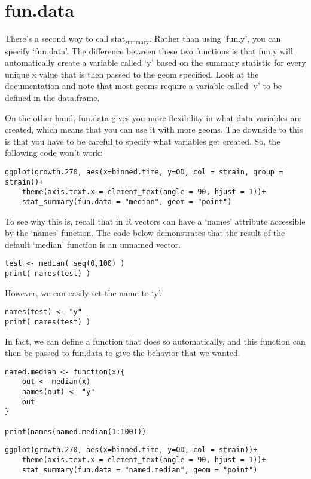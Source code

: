 \documentclass[11pt]{article}
\begin{document}
\section{fun.data}
\label{sec-2}


There's a second way to call stat$_{\mathrm{summary}}$. Rather than using `fun.y',
you can specify `fun.data'. The difference between these two functions
is that fun.y will automatically create a variable called `y' based on
the summary statistic for every unique x value that is then passed to the geom specified. 
Look at the documentation and note that most geoms require a variable
called `y' to be defined in the data.frame.

On the other hand, fun.data gives you more flexibility in what data
variables are created, which means that you can use it with more
geoms. The downside to this is that you have to be
careful to specify what variables get created. So, the following code
won't work:

\begin{verbatim}
ggplot(growth.270, aes(x=binned.time, y=OD, col = strain, group = strain))+
    theme(axis.text.x = element_text(angle = 90, hjust = 1))+
    stat_summary(fun.data = "median", geom = "point")
\end{verbatim}


To see why this is, recall that in R vectors can have a `names'
attribute accessible by the `names' function. The code below
demonstrates that the result of the default `median' function is an
unnamed vector. 

\begin{verbatim}
test <- median( seq(0,100) )
print( names(test) )
\end{verbatim}


However, we can easily set the name to `y'.

\begin{verbatim}
names(test) <- "y"
print( names(test) )
\end{verbatim}


In fact, we can define a function that does so automatically, and this
function can then be passed to fun.data to give the behavior that we
wanted.

\begin{verbatim}
named.median <- function(x){
    out <- median(x)
    names(out) <- "y"
    out
}

print(names(named.median(1:100)))
\end{verbatim}


\begin{verbatim}
ggplot(growth.270, aes(x=binned.time, y=OD, col = strain))+
    theme(axis.text.x = element_text(angle = 90, hjust = 1))+
    stat_summary(fun.data = "named.median", geom = "point")
\end{verbatim}
\end{document}
